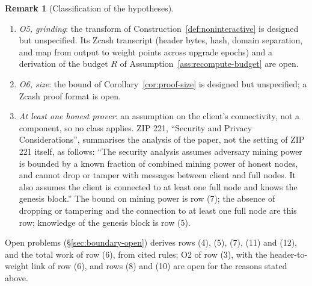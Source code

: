 \documentclass[11pt,a4paper]{article}
\theoremstyle{definition}
\newtheorem{remark}[theorem]{Remark}
\begin{document}
\begin{remark}[Classification of the hypotheses]
\begin{enumerate}[label=(\arabic*)]
  or specification section fixes a sampling hash for Zcash, so the
  hypothesis has no object; the model is that of the \emph{Crypto Guide},
  \S``The random oracle model''.
\item \emph{O5, grinding}: the transform of
  Construction~\ref{def:noninteractive} is designed but unspecified. Its
  Zcash transcript (header bytes, hash, domain separation, and map from
  output to weight points across upgrade epochs) and a derivation of the
  budget $R$ of Assumption~\ref{ass:recompute-budget} are open.
\item \emph{O6, size}: the bound of Corollary~\ref{cor:proof-size} is
  designed but unspecified; a Zcash proof format is open.
\item \emph{At least one honest prover}: an assumption on the client's
  connectivity, not a component, so no class applies. ZIP 221, ``Security
  and Privacy Considerations'', summarises the analysis of the paper, not
  the setting of ZIP 221 itself, as follows: ``The security analysis assumes
  adversary mining power is bounded by a known fraction of combined mining
  power of honest nodes, and cannot drop or tamper with messages between
  client and full nodes. It also assumes the client is connected to at least
  one full node and knows the genesis block.'' The bound on mining power is
  row (7); the absence of dropping or tampering and the connection to at
  least one full node are this row; knowledge of the genesis block is
  row (5).
\end{enumerate}
Open problems (\S\ref{sec:boundary-open}) derives rows (4), (5), (7), (11)
and (12), and the total work of row (6), from cited rules; O2 of row (3),
with the header-to-weight link of row (6), and rows (8) and (10) are open
for the reasons stated above.
\end{remark}
\end{document}
